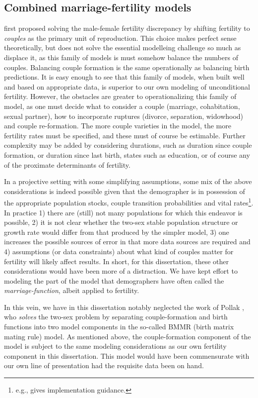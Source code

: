 \subsection{Combined marriage-fertility models} 
\citet{karmel1947relations}
first proposed solving the male-female fertility discrepancy by shifting
fertility to \textit{couples} as the primary unit of reproduction. This choice
makes perfect sense theoretically, but does not solve the essential modelleing
challenge so much as displace it, as this family of models is
must somehow balance the numbers of couples. Balancing couple formation is the
same operationally as balancing birth predictions. It is easy enough to see that
this family of models, when built well and based on appropriate data, is
superior to our own modeling of unconditional fertility. However, the
obstacles are greater to operationalizing this family of model, as one must
decide what to consider a couple (marriage, cohabitation, sexual
partner), how to incorporate ruptures (divorce, separation, widowhood) and
couple re-formation. The more couple varieties in the model, the more fertility
rates must be specified, and these must of course be estimable. Further
complexity may be added by considering durations, such as duration since 
couple formation, or duration since last birth, states such as
education, or of course any of the proximate determinants of
fertility\citep{bongaarts1982fertility, bongaarts1978framework,
bongaarts1983fertility}. 

In a projective setting with some simplifying assumptions, some mix of the above
considerations is indeed possible given that the demographer is in possession of
the appropriate population stocks, couple transition probabilities and
vital rates\footnote{e.g., \citep{schoen1987modeling} gives implementation
guidance.}. In practice 1) there are (still) not many populations for which this
endeavor is possible, 2) it is not clear whether the two-sex stable population
structure or growth rate would differ from that produced by the simpler model,
3) one increases the possible sources of error in that more data sources are
required and 4) assumptions (or data constraints) about what kind of couples
matter for fertility will likely affect results. In short, for this
dissertation, these other considerations would have been more of a distraction.
We have kept effort to modeling the part of the model that demographers have
often called the \textit{marriage-function}, albeit applied to fertility.

In this vein, we have in this dissertation notably neglected the work of Pollak
\citep{pollak1986reformulation, pollak1987two, pollak1990two}, who
\textit{solves} the two-sex problem by separating couple-formation and birth
functions into two model components in the so-called BMMR (birth matrix mating
rule) model. As mentioned above, the couple-formation component of the model is
subject to the same modeling considerations as our own fertility component in
this dissertation. This model would have been commensurate with our own line of
presentation had the requisite data been on hand.

